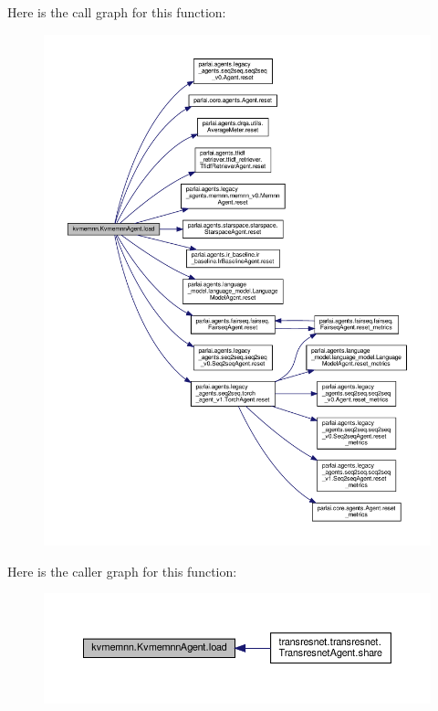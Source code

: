Here is the call graph for this function\+:
\nopagebreak
\begin{figure}[H]
\begin{center}
\leavevmode
\includegraphics[width=350pt]{classkvmemnn_1_1KvmemnnAgent_a4a7c16982a6d0364a6f7eca56734ee0b_cgraph}
\end{center}
\end{figure}
Here is the caller graph for this function\+:
\nopagebreak
\begin{figure}[H]
\begin{center}
\leavevmode
\includegraphics[width=350pt]{classkvmemnn_1_1KvmemnnAgent_a4a7c16982a6d0364a6f7eca56734ee0b_icgraph}
\end{center}
\end{figure}
\mbox{\label{classkvmemnn_1_1KvmemnnAgent_a54b08c3fbe7f12d55a8ea6669b18726d}} 
